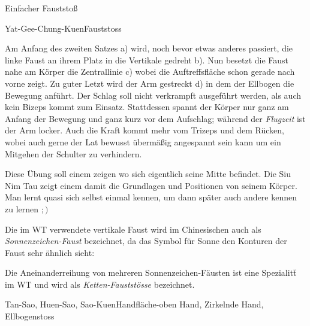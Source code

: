 \begin{WTSatz}{Einfacher Fauststo{\ss}}%
	
	
	\begin{WTSatzTeil}{Yat-Gee-Chung-Kuen}{Fauststoss}
		
		Am Anfang des zweiten Satzes a) wird, noch bevor etwas anderes passiert, die linke Faust an ihrem Platz in die Vertikale gedreht b). Nun besetzt die Faust nahe am K\"orper die Zentrallinie c) wobei die Auftreffsfl\"ache schon gerade nach vorne zeigt. Zu guter Letzt wird der Arm gestreckt d) in dem der Ellbogen die Bewegung anf\"uhrt. Der Schlag soll nicht verkrampft ausgef\"uhrt werden, als auch kein Bizeps kommt zum Einsatz. Stattdessen spannt der K\"orper nur ganz am Anfang der Bewegung und ganz kurz vor dem Aufschlag; w\"ahrend der \textit{Flugzeit} ist der Arm locker. Auch die Kraft kommt mehr vom Trizeps und dem R\"ucken, wobei auch gerne der Lat bewusst \"uberm\"a{\ss}ig angespannt sein kann um ein Mitgehen der Schulter zu verhindern.
		
		Diese \"Ubung soll einem zeigen wo sich eigentlich seine Mitte befindet. Die Siu Nim Tau zeigt einem damit die Grundlagen und Positionen von seinem K\"orper. Man lernt quasi sich selbst einmal kennen, um dann sp\"ater auch andere kennen zu lernen $;)$
		
	\begin{WTCommonBegriff}
		Die im WT verwendete vertikale Faust wird im Chinesischen auch als \textit{Sonnenzeichen-Faust} bezeichnet, da das Symbol f\"ur Sonne den Konturen der Faust sehr \"ahnlich sieht:
		
		\flushleft
		
		Die Aneinanderreihung von mehreren Sonnenzeichen-F\"austen ist eine Spezialit\"t im WT und wird als \textit{Ketten-Faustst\"osse} bezeichnet.
	\end{WTCommonBegriff}
			
		
		
	\end{WTSatzTeil}
	\begin{WTSatzTeil}{Tan-Sao, Huen-Sao, Sao-Kuen}{Handfl\"ache-oben Hand, Zirkelnde Hand, Ellbogenstoss}
	

\end{WTSatzTeil}
\end{WTSatz}
